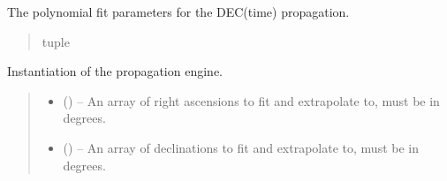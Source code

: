 \documentclass[letterpaper,11pt,english]{sphinxmanual}
\begin{document}
\begin{savenotes}
\begin{fulllineitems}

\begin{savenotes}\begin{fulllineitems}
\label{\detokenize{code/opihiexarata.propagate.polynomial:opihiexarata.propagate.polynomial.LinearPropagationEngine.dec_poly_param}}
\pysigstartsignatures
{}
\pysigstopsignatures
\sphinxAtStartPar
The polynomial fit parameters for the DEC(time) propagation.
\begin{quote}\begin{description}
\sphinxAtStartPar
tuple

\end{description}\end{quote}

\end{fulllineitems}\end{savenotes}


\begin{savenotes}\begin{fulllineitems}
\label{\detokenize{code/opihiexarata.propagate.polynomial:opihiexarata.propagate.polynomial.LinearPropagationEngine.__init__}}
\pysigstartsignatures
{}
\pysigstopsignatures
\sphinxAtStartPar
Instantiation of the propagation engine.
\begin{quote}\begin{description}
\begin{itemize}
\item {} 
\sphinxAtStartPar
{} () – An array of right ascensions to fit and extrapolate to, must be in
degrees.

\item {} 
\sphinxAtStartPar
{} () – An array of declinations to fit and extrapolate to, must be in
degrees.


\end{itemize}
\end{description}
\end{quote}
\end{fulllineitems}
\end{savenotes}
\end{fulllineitems}
\end{savenotes}
\end{document}
